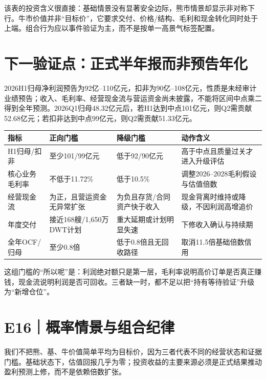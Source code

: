 该表的投资含义很直接：基础情景没有显著安全边际，熊市情景却显示非对称下行。牛市价值并非“目标价”，它要求交付、价格/结构、毛利和现金转化同时处于上端。组合行为应以事件验证为主，而不是按单一高景气标签配置。

\section{下一验证点：正式半年报而非预告年化}

2026H1归母净利润预告为92亿--110亿元，扣非为90亿--108亿元，性质是未经审计业绩预告；收入、毛利率、经营现金流与营运资金尚未披露，不能将区间中点乘二得到全年预测。2026Q1归母48.32亿元后，若H1达到中点101亿元，则Q2需贡献52.68亿元；若扣非达到中点99亿元，则Q2需贡献51.33亿元。

\begin{exhibitbox}[下一季度盈利与质量门槛]
\small
\begin{tabularx}{\exhibitboxwidth}{L{3.0cm}C{2.4cm}C{2.4cm}X}
\toprule
\textbf{指标} & \textbf{正向门槛} & \textbf{降级门槛} & \textbf{动作含义} \\
\midrule
H1归母/扣非 & 至少101/99亿元 & 低于92/90亿元 & 高于中点且质量过关才进入升级评估 \\
核心业务毛利率 & 不低于11.72\% & 低于10.5\% & 调整2026--2028毛利假设与估值倍数 \\
经营现金流 & 为正，且营运资金无异常扩张 & 为负且存货/合同资产快于收入 & 现金背离时维持或降级，不因利润高增追价 \\
年度交付 & 接近168艘/1,650万DWT计划 & 重大延期或计划明显失速 & 下修收入确认与持续期 \\
全年OCF/归母 & 至少0.8倍 & 低于0.8倍且无回收路径 & 取消11.5倍基础倍数信用 \\
\bottomrule
\end{tabularx}
\end{exhibitbox}

这组门槛的“所以呢”是：利润绝对额只是第一层，毛利率说明高价订单是否真正赚钱，现金流说明利润是否可回收。三者缺一时，都不足以把“持有等待验证”升级为“新增仓位”。

\section{E16｜概率情景与组合纪律}

我们不把熊、基、牛价值简单平均为目标价，因为三者代表不同的经营状态和证据门槛。基础状态下，估值回报几乎为零；投资收益的主要来源必须是正式结果推动盈利预测上修，而不是依赖倍数扩张。

